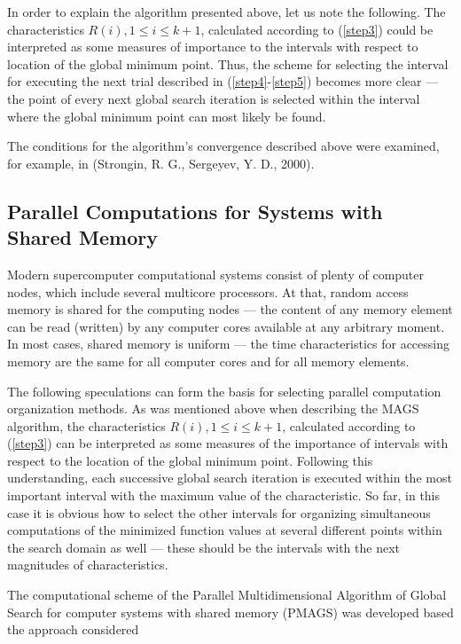 \documentclass{gOMS2e}
\theoremstyle{plain}%
\theoremstyle{definition}
\theoremstyle{remark}
\begin{document}
\par
In order to explain the algorithm presented above, let us note the following.
The characteristics \(R(i), 1\leqslant i\leqslant k+1\), calculated according to (\ref{step3})
could be interpreted as some measures of importance to the intervals with respect to
location of the global minimum point. Thus, the scheme for selecting the interval
for executing the next trial described in (\ref{step4}-\ref{step5}) becomes more clear --- the point of every next
global search iteration is selected within the interval where the global minimum point can most likely be found.
\par
The conditions for the algorithm’s convergence described above were examined, for example, in (Strongin, R. G., Sergeyev, Y. D., 2000).

\subsection{Parallel Computations for Systems with Shared Memory}
\label{subsec:sharedpar}
Modern supercomputer computational systems consist of plenty of computer nodes,
which include several multicore processors. At that, random access memory is
shared for the computing nodes --- the content of any memory element can be read (written)
by any computer cores available at any arbitrary moment. In most cases, shared memory is
uniform --- the time characteristics for accessing memory are the same for all computer
cores and for all memory elements.
\par
The following speculations can form the basis for selecting parallel computation
organization methods. As was mentioned above when describing the MAGS algorithm,
the characteristics \(R(i),1\leqslant i\leqslant k+1\), calculated according to (\ref{step3})
can be interpreted as some measures of the importance of intervals with respect to the location of
the global minimum point. Following this understanding, each successive global search
iteration is executed within the most important interval with the maximum value of the
characteristic. So far, in this case it is obvious how to select the other intervals for
organizing simultaneous computations of the minimized function values at several different
points within the search domain as well --- these should be the intervals with the next
magnitudes of characteristics.
\par
The computational scheme of the Parallel Multidimensional Algorithm of Global Search for
computer systems with shared memory (PMAGS) was developed based the approach considered
\end{document}
